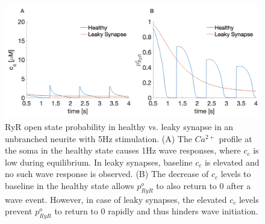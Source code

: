 \documentclass[review,supplement,onefignum,onetabnum]{siamart190516}
\begin{document}
\begin{figure}[!h]\label{fig:cc_andPory_supp}
    \centering
    \includegraphics[width=12cm]{Figures/cc_andPory_supp.png}
    \caption{RyR open state probability in healthy vs. leaky synapse in an unbranched neurite with 5Hz stimulation. (A) The $Ca^{2+}$ profile at the soma in the healthy state causes 1Hz wave responses, where $c_c$ is low during equilibrium. In leaky synapses, baseline $c_c$ is elevated and no such wave response is observed. (B) The decrease of $c_c$ levels to baseline in the healthy state allows $p^o_{RyR}$ to also return to $0$ after a wave event. However, in case of leaky synapses, the elevated $c_c$ levels prevent $p^o_{RyR}$ to return to $0$ rapidly and thus hinders wave initiation.}
\end{figure}
\end{document}
